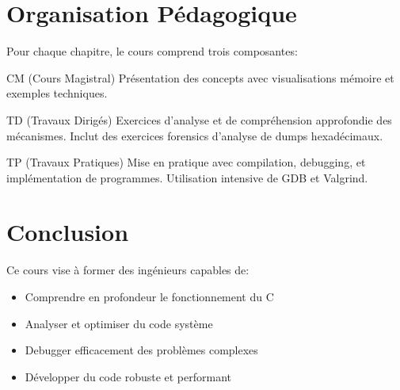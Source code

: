 \documentclass[11pt,a4paper]{article}
\begin{document}
\section{Organisation Pédagogique}

Pour chaque chapitre, le cours comprend trois composantes:

\begin{center}
\end{center}

\begin{definitionbox}{CM (Cours Magistral)}
Présentation des concepts avec visualisations mémoire et exemples techniques.
\end{definitionbox}

\begin{definitionbox}{TD (Travaux Dirigés)}
Exercices d'analyse et de compréhension approfondie des mécanismes. Inclut des exercices forensics d'analyse de dumps hexadécimaux.
\end{definitionbox}

\begin{definitionbox}{TP (Travaux Pratiques)}
Mise en pratique avec compilation, debugging, et implémentation de programmes. Utilisation intensive de GDB et Valgrind.
\end{definitionbox}

\section{Conclusion}

Ce cours vise à former des ingénieurs capables de:
\begin{itemize}
\item Comprendre en profondeur le fonctionnement du C
\item Analyser et optimiser du code système
\item Debugger efficacement des problèmes complexes
\item Développer du code robuste et performant
\end{itemize}
\end{document}
